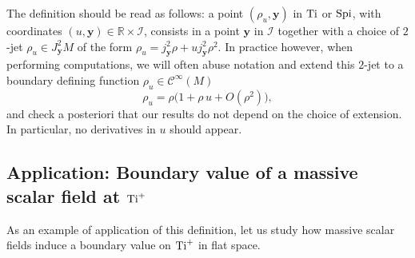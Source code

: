 \documentclass[a4paper, 10pt]{article}
\theoremstyle{remark}
\newcommand\ynote[1]{\textcolor{green!60!black}{\bf [Y:\,#1]}}
\newcommand{\ymod}[1]{\textcolor{green!60!black}{#1}}
\newcommand{\e}{{\color{red} \varepsilon}}
\newcommand{\Ti}{\textnormal{Ti}}
\newcommand{\Spi}{\textnormal{Spi}}
\newcommand{\y}{\bm{y}}
\begin{document}
The definition should be read as follows: a point $(\rho_u, \bm{y})$ in $\Ti$ or $\Spi$, with coordinates $(u,\y) \in \mathbb{R}\times \mathcal{I}$, consists in a point $\bm{y}$ in $\mathcal{I}$ together with a choice of $2$-jet $\rho_u \in J^2_{\y}M$ of the form $\rho_u = j^2_{\y} \rho + u  j^2_{\y} \rho^2$. In practice however, when performing computations, we will often abuse notation and extend this $2$-jet to a boundary defining function $\rho_u \in \mathcal{C}^{\infty}(M)$
\begin{equation}\label{eq:ConventionsCoordinateu}
   \rho_u = \rho \Big(1 + \rho\, u + O(\rho^2) \Big),
\end{equation}
and check a posteriori that our results do not depend on the choice of extension. In particular, no derivatives in $u$ should appear.

\subsection[Application: Boundary value of a massive scalar field at Ti]{Application: Boundary value of a massive scalar field at $\Ti^+$}

As an example of application of this definition, let us study how massive scalar fields induce a boundary value on $\Ti^{+}$ in flat space.
\end{document}
